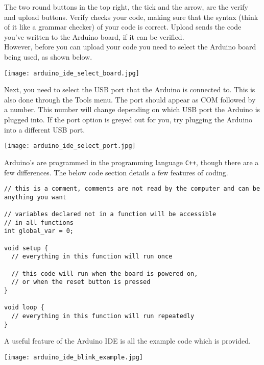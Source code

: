 \documentclass[../TinyBot.tex]{subfiles}
\begin{document}
The two round buttons in the top right, the tick and the arrow, are the verify and upload buttons.
Verify checks your code, making sure that the syntax (think of it like a grammar checker) of
your code is correct. Upload sends the code you've written to the Arduino board, if it can be verified.  \\

However, before you can upload your code you need to select the Arduino board being used, as shown below.

\begin{center}
  \texttt{[image: arduino\_ide\_select\_board.jpg]}
\end{center}

Next, you need to select the USB port that the Arduino is connected to. This is also done
through the Tools menu. The port should appear as COM followed by a number. This number
will change depending on which USB port the Arduino is plugged into. If the port option is
greyed out for you, try plugging the Arduino into a different USB port. 

\begin{center}
  \texttt{[image: arduino\_ide\_select\_port.jpg]}
\end{center}

\bigskip

Arduino's are programmed in the programming language \lstinline[]!C++!, though there
are a few differences. The below code section details a few features of coding.

\begin{lstlisting}
// this is a comment, comments are not read by the computer and can be anything you want

// variables declared not in a function will be accessible
// in all functions
int global_var = 0;

void setup {
  // everything in this function will run once

  // this code will run when the board is powered on,
  // or when the reset button is pressed
}

void loop {
  // everything in this function will run repeatedly
}

\end{lstlisting}
\bigskip

\pagebreak
A useful feature of the Arduino IDE is all the example code which is provided.

\begin{center}
    \texttt{[image: arduino\_ide\_blink\_example.jpg]}
    \label{fig:ide-blink}
\end{center}
\end{document}
